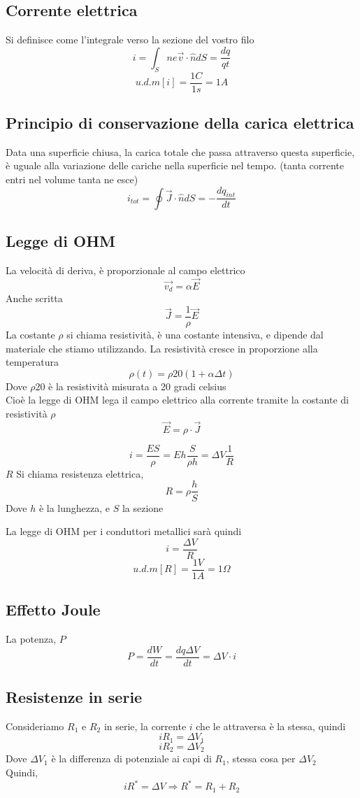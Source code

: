 \documentclass[a4paper]{report}
\begin{document}
  \subsection{Corrente elettrica}
  Si definisce come l'integrale verso la sezione del vostro filo
  \[ i = \int_S n e \vec{v} \cdot \hat{n} dS = \frac{dq}{qt}\]
  \[ u.d.m[i]=\frac{1C}{1s}= 1A \]

  \subsection{Principio di conservazione della carica elettrica}
  Data una superficie chiusa, la carica totale che passa attraverso questa superficie, è uguale alla variazione delle cariche nella superficie nel tempo. (tanta corrente entri nel volume tanta ne esce)
  \[ i_{tot} = \oint \vec{J} \cdot \hat{n} dS = -\frac{dq_{int}}{dt} \]

  \subsection{Legge di OHM}
  La velocità di deriva, è proporzionale al campo elettrico
  \[ \vec{v_d} = \alpha \vec{E} \]
  Anche scritta
  \[ \vec{J} = \frac{1}{\rho} \vec{E} \]
  La costante $\rho$ si chiama resistività, è una costante intensiva, e dipende dal materiale che stiamo utilizzando.
  La resistività cresce in proporzione alla temperatura
  \[ \rho(t) = \rho{20}(1 + \alpha \Delta t) \]
  Dove $\rho{20}$ è la resistività misurata a 20 gradi celsius\\
  Cioè la legge di OHM lega il campo elettrico alla corrente tramite la costante di resistività $\rho$
  \[ \vec{E} = \rho \cdot \vec{J} \]


  \[ i = \frac{ES}{\rho} = Eh \frac{S}{\rho h} = \Delta V \frac{1}{R} \]
  $R$ Si chiama resistenza elettrica,
  \[ R = \rho \frac{h}{S} \]
  Dove $h$ è la lunghezza, e $S$ la sezione

  La legge di OHM per i conduttori metallici sarà quindi
  \[ i = \frac{\Delta V}{R} \]
  \[ u.d.m[R] = \frac{1V}{1A} = 1 \Omega \]

  \subsection{Effetto Joule}
  La potenza, $P$
  \[ P=\frac{dW}{dt} = \frac{dq\Delta V}{dt} = \Delta V \cdot i\]

  \subsection{Resistenze in serie}
  Consideriamo $R_1$ e $R_2$ in serie, la corrente $i$ che le attraversa è la stessa, quindi
  \[ i R_1 = \Delta V_1 \]
  \[ i R_2 = \Delta V_2 \]
  Dove $\Delta V_1$ è la differenza di potenziale ai capi di $R_1$, stessa cosa per $\Delta V_2$\\
  Quindi,
  \[ i R^* = \Delta V \Rightarrow R^* = R_1 +R_2 \]
\end{document}
